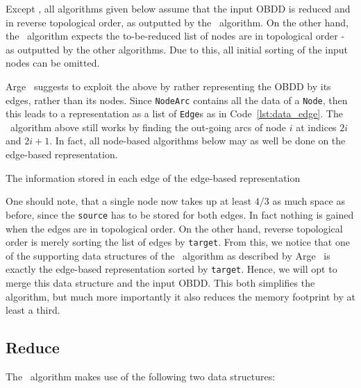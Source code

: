 Except \Reduce, all algorithms given below assume that the input OBDD is reduced
and in reverse topological order, as outputted by the \Reduce\ algorithm. On the
other hand, the \Reduce\ algorithm expects the to-be-reduced list of nodes are
in topological order - as outputted by the other algorithms. Due to this, all
initial sorting of the input nodes can be omitted. \cite{Arge96}

Arge~\cite{Arge96} suggests to exploit the above by rather representing the OBDD
by its edges, rather than its nodes. Since \lstinline{NodeArc} contains all the
data of a \lstinline{Node}, then this leads to a representation as a list of
\lstinline{Edge}s as in Code~\ref{lst:data_edge}. The \Evaluate\ algorithm above
still works by finding the out-going arcs of node $i$ at indices $2i$ and
$2i+1$. In fact, all node-based algorithms below may as well be done on the
edge-based representation.

\begin{lstfloat}[ht!]
  \centering

  

  \caption{The information stored in each edge of the edge-based representation}
  \label{lst:data_edge}
\end{lstfloat}

One should note, that a single node now takes up at least $4/3$ as much space as
before, since the \lstinline{source} has to be stored for both edges. In fact
nothing is gained when the edges are in topological order. On the other hand,
reverse topological order is merely sorting the list of edges by
\lstinline{target}. From this, we notice that one of the supporting data
structures of the \Reduce\ algorithm as described by Arge~\cite{Arge96} is
exactly the edge-based representation sorted by \lstinline{target}. Hence, we
will opt to merge this data structure and the input OBDD. This both simplifies
the algorithm, but much more importantly it also reduces the memory footprint by
at least a third.

\subsection{Reduce} \label{sec:theory__reduce}
The \Reduce\ algorithm makes use of the following two data structures:

